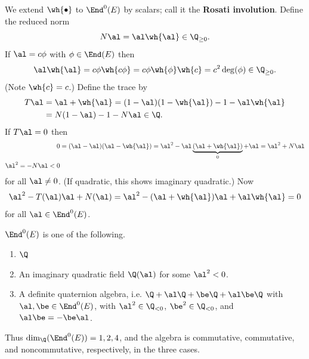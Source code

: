 We extend $\wh{\bullet}$ to $\End^0(E)$ by scalars; call it the \textbf{Rosati involution}. Define the reduced norm
\[N\al=\al\wh{\al}\in \Q_{\ge 0}.\]
If $\al=c\phi$ with $\phi\in \End(E)$ then 
\[
\al\wh{\al}=c\phi\wh{c\phi}=c\phi\wh{\phi}\wh{c}=c^2\deg(\phi) \in \Q_{\ge0}.
\]
(Note $\wh{c}=c$.) Define the trace by 
\begin{align*}
T\al&=\al+\wh{\al}=(1-\al)(1-\wh{\al})-1-\al\wh{\al}\\
&=N(1-\al)-1-N\al\in \Q.
\end{align*}
If $T\al=0$ then
\begin{align*}
0&=(\al-\al)(\al-\wh{\al})=\al^2-\al\underbrace{(\al+\wh{\al})}_0+\al=
\al^2+N\al\\
\al^2=-N\al<0
\end{align*}
for all $\al\ne 0$.
(If quadratic, this shows imaginary quadratic.)
Now
\[
\al^2-T(\al)\al +N(\al) = \al^2-(\al+\wh{\al})\al+\al\wh{\al}=0
\]
for all $\al\in \End^0(E)$.
\begin{thm}
$\End^0(E)$ is one of the following.
\begin{enumerate}
\item
$\Q$
\item
An imaginary quadratic field $\Q(\al)$ for some $\al^2<0$. 
\item
A definite quaternion algebra, i.e. $\Q+\al\Q+\be\Q+\al\be\Q$ with $\al,\be\in \End^0(E)$, with $\al^2\in \Q_{<0}$, $\be^2\in \Q_{<0}$, and $\al\be = -\be \al$.
\end{enumerate}
Thus $\dim_{\Q}(\End^0(E))=1,2,4$, and the algebra is commutative, commutative, and noncommutative, respectively, in the three cases.
\end{thm}
